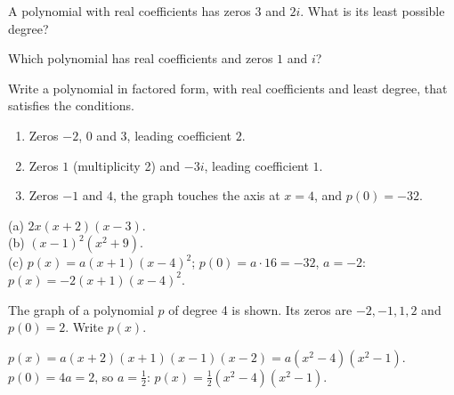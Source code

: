 \begin{exo}{}
A polynomial with real coefficients has zeros $3$ and $2i$. What is its least possible degree?
\end{exo}
\begin{exo}{}
Which polynomial has real coefficients and zeros $1$ and $i$?
\end{exo}
\begin{exo}{}
Write a polynomial in factored form, with real coefficients and least degree, that satisfies the conditions.
\begin{enumerate}[label=(\alph*)]
\item Zeros $-2$, $0$ and $3$, leading coefficient $2$.
\item Zeros $1$ (multiplicity 2) and $-3i$, leading coefficient $1$.
\item Zeros $-1$ and $4$, the graph touches the axis at $x=4$, and $p(0)=-32$.
\end{enumerate}
\begin{solution}
(a) $2x(x+2)(x-3)$.\\
(b) $(x-1)^2(x^2+9)$.\\
(c) $p(x)=a(x+1)(x-4)^2$; $p(0)=a\cdot16=-32$, $a=-2$: $p(x)=-2(x+1)(x-4)^2$.
\end{solution}
\end{exo}
\begin{exo}{}
The graph of a polynomial $p$ of degree 4 is shown.
Its zeros are $-2,-1,1,2$ and $p(0)=2$. Write $p(x)$.
\begin{solution}
$p(x)=a(x+2)(x+1)(x-1)(x-2)=a(x^2-4)(x^2-1)$. $p(0)=4a=2$, so $a=\frac12$: $p(x)=\frac12(x^2-4)(x^2-1)$.
\end{solution}
\end{exo}

